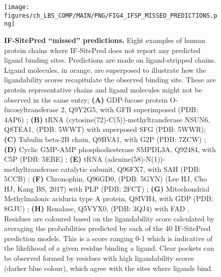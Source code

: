 \begin{figure}[ht!]
    \centering
    \texttt{[image: figures/ch\_LBS\_COMP/MAIN/PNG/FIG4\_IFSP\_MISSED\_PREDICTIONS.png]}
    \caption[IF-SitePred ``missed'' predictions]{\textbf{IF-SitePred ``missed'' predictions.} Eight examples of human protein chains where IF-SitePred does not report any predicted ligand binding sites. Predictions are made on ligand-stripped chains. Ligand molecules, in orange, are superposed to illustrate how the ligandability scores recapitulate the observed binding site. These are protein representative chains and ligand molecules might not be observed in the same entry; \textbf{(A)} GDP-fucose protein O-fucosyltransferase 2, Q9Y2G5, with GFB superimposed (PDB: 4AP6) \cite{CHEN_2012_POFUT2}; \textbf{(B)} tRNA (cytosine(72)-C(5))-methyltransferase NSUN6, Q8TEA1, (PDB: 5WWT) \cite{LIU_2017_NSUN6} with superposed SFG (PDB: 5WWR); \textbf{(C)} Tubulin beta-2B chain, Q9BVA1, with G2P (PDB: 7ZCW) \cite{RAMIREZ_2023_VASH2}; \textbf{(D)} Cyclic GMP-AMP phosphodiesterase SMPDL3A, Q92484, with C5P (PDB: 5EBE) \cite{LIM_2016_SPHINGOMYELIN}; \textbf{(E)} tRNA (adenine(58)-N(1))-methyltransferase catalytic subunit, Q96FX7, with SAH (PDB: 5CCB) \cite{FINER_2015_tRNA}; \textbf{(F)} Chronophin, Q96GD0, (PDB: 5GYN) (Lee HJ, Cho HJ, Kang BS, 2017) with PLP (PDB: 2FCT) \cite{BLASIAK_2006_SYRB2}; \textbf{(G)} Mitochondrial Methylmalonic aciduria type A protein, Q8IVH4, with GDP (PDB: 8GJU) \cite{MASCARENHAS_2023_GPROTEIN}; \textbf{(H)} Renalase, Q5VYX0, (PDB: 3QJ4) with FAD \cite{MILANI_2011_NADP}. Residues are coloured based on the ligandability score calculated by averaging the probabilities predicted by each of the 40 IF-SitePred prediction models. This is a score ranging 0-1 which is indicative of the likelihood of a given residue binding a ligand. Clear pockets can be observed formed by residues with high ligandability scores (darker blue colour), which agree with the sites where ligands bind.}
    \label{fig:ifsp_missed_preds}
\end{figure}

